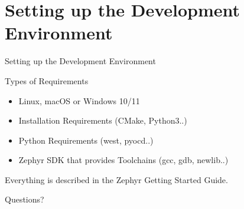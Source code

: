 \documentclass[10pt, aspectratio=169]{beamer}
\begin{document}
\section{Setting up the Development Environment}

\begin{frame}[fragile]{Setting up the Development Environment}

  \begin{block}{Types of Requirements}
    \begin{itemize}
      \item Linux, macOS or Windows 10/11
      \item Installation Requirements (CMake, Python3..)
      \item Python Requirements (west, pyocd..)
      \item Zephyr SDK that provides Toolchains (gcc, gdb, newlib..)
    \end{itemize}
  \end{block}
  Everything is described in the Zephyr Getting Started Guide.
\end{frame}

\begin{frame}[standout]
  Questions?
\end{frame}
\end{document}
